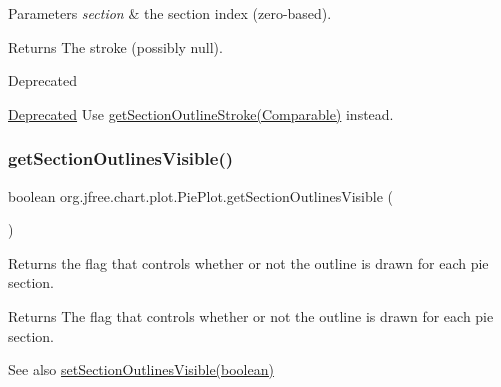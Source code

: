 \begin{DoxyParams}{Parameters}
{\em section} & the section index (zero-\/based).\\
\hline
\end{DoxyParams}
\begin{DoxyReturn}{Returns}
The stroke (possibly {\ttfamily null}).
\end{DoxyReturn}
\begin{DoxyRefDesc}{Deprecated}
\item[\mbox{\hyperlink{deprecated__deprecated000076}{Deprecated}}]Use \mbox{\hyperlink{classorg_1_1jfree_1_1chart_1_1plot_1_1_pie_plot_a5a568c273b4e925fd3c93647b806a9b9}{get\+Section\+Outline\+Stroke(\+Comparable)}} instead. \end{DoxyRefDesc}
\mbox{\label{classorg_1_1jfree_1_1chart_1_1plot_1_1_pie_plot_a071003f5ce49b26446c76598ce3b63f6}} 
\subsubsection{\texorpdfstring{get\+Section\+Outlines\+Visible()}{getSectionOutlinesVisible()}}
{\footnotesize\ttfamily boolean org.\+jfree.\+chart.\+plot.\+Pie\+Plot.\+get\+Section\+Outlines\+Visible (\begin{DoxyParamCaption}{ }\end{DoxyParamCaption})}

Returns the flag that controls whether or not the outline is drawn for each pie section.

\begin{DoxyReturn}{Returns}
The flag that controls whether or not the outline is drawn for each pie section.
\end{DoxyReturn}
\begin{DoxySeeAlso}{See also}
\mbox{\hyperlink{classorg_1_1jfree_1_1chart_1_1plot_1_1_pie_plot_a1bd6cc215c5393df4f17f499c92b08bf}{set\+Section\+Outlines\+Visible(boolean)}} 
\end{DoxySeeAlso}
\mbox{\label{classorg_1_1jfree_1_1chart_1_1plot_1_1_pie_plot_ad50a2ec9a9fb6fdf8992e8f64f57bd1d}} 
